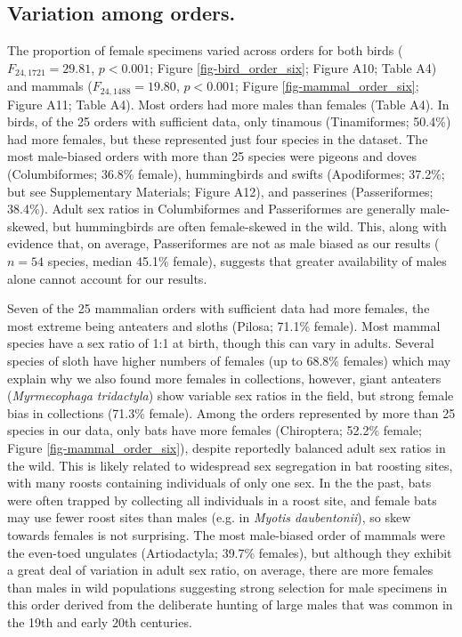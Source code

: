 \documentclass[a4paper, 12pt]{article}
\begin{document}
\subsection{Variation among orders.} 
The proportion of female specimens varied across orders for both birds ($F_{24, 1721} = 29.81$, $p < 0.001$; Figure \ref{fig-bird_order_six}; Figure A10; Table A4) and mammals ($F_{24, 1488} = 19.80$, $p < 0.001$; Figure \ref{fig-mammal_order_six}; Figure A11; Table A4). 
Most orders had more males than females (Table A4). 
In birds, of the 25 orders with sufficient data, only tinamous (Tinamiformes; 50.4\%) had more females, but these represented just four species in the dataset. 
The most male-biased orders with more than 25 species were pigeons and doves (Columbiformes; 36.8\% female), hummingbirds and swifts (Apodiformes; 37.2\%; but see Supplementary Materials; Figure A12), and passerines (Passeriformes; 38.4\%). 
Adult sex ratios in Columbiformes and Passeriformes are generally male-skewed\cite{szekely2014sex,bosque2019skewed,mayr1939sex}, but hummingbirds are often female-skewed in the wild\cite{szekely2014sex,mayr1939sex}. 
This, along with evidence that, on average, Passeriformes are not as male biased as our results ($n = 54$ species, median 45.1\% female\cite{szekely2014sex}), suggests that greater availability of males alone cannot account for our results.

Seven of the 25 mammalian orders with sufficient data had more females, the most extreme being anteaters and sloths (Pilosa; 71.1\% female). 
Most mammal species have a sex ratio of 1:1 at birth\cite{karlin1986theoretical}, though this can vary in adults. 
Several species of sloth have higher numbers of females (up to 68.8\% females\cite{reyes2015informacion}) which may explain why we also found more females in collections, however, giant anteaters (\textit{Myrmecophaga tridactyla}) show variable sex ratios in the field\cite{anteater2005}, but strong female bias in collections (71.3\% female). 
Among the orders represented by more than 25 species in our data, only bats have more females (Chiroptera; 52.2\% female; Figure \ref{fig-mammal_order_six}), despite reportedly balanced adult sex ratios in the wild\cite{altringham}. 
This is likely related to widespread sex segregation in bat roosting sites, with many roosts containing individuals of only one sex\cite{altringham}. 
In the the past, bats were often trapped by collecting all individuals in a roost site, and female bats may use fewer roost sites than males (e.g. in \textit{Myotis daubentonii}\cite{encarnaccao2012spatiotemporal}), so skew towards females is not surprising. 
The most male-biased order of mammals were the even-toed ungulates (Artiodactyla; 39.7\% females), but although they exhibit a great deal of variation in adult sex ratio, on average, there are more females than males in wild populations\cite{berger1999sex} suggesting strong selection for male specimens in this order derived from the deliberate hunting of large males that was common in the 19th and early 20th centuries.
\end{document}
